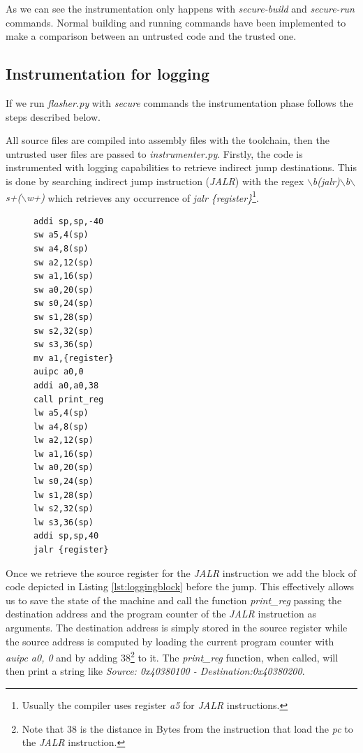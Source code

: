 As we can see the instrumentation only happens with \textit{secure-build} and
\textit{secure-run} commands. Normal building and running commands have been
implemented to make a comparison between an untrusted code and the trusted one.

\subsection{Instrumentation for logging}
\label{subsec:logging}

If we run \textit{flasher.py} with \textit{secure} commands the instrumentation phase
follows the steps described below.

All source files are compiled into assembly files with the toolchain, then the
untrusted user files are passed to \textit{instrumenter.py}. Firstly, the code is
instrumented with logging capabilities to retrieve indirect jump destinations.
This is done by searching indirect jump instruction (\textit{JALR}) with the regex
\textit{$\backslash$b(jalr)$\backslash$b$\backslash$s+($\backslash$w+)} which
retrieves any occurrence of \textit{jalr \{register\}}\footnote{Usually the
compiler uses register \textit{a5} for \textit{JALR} instructions.}.

\begin{figure}
  \setlength{\intextsep}{0pt}
  \begin{minipage}{0.25\textwidth}
    \begin{lstlisting}[style=Assembly, caption = Logging code block, label={lst:loggingblock}]
addi sp,sp,-40
sw a5,4(sp)
sw a4,8(sp)
sw a2,12(sp)
sw a1,16(sp)
sw a0,20(sp)
sw s0,24(sp)
sw s1,28(sp)
sw s2,32(sp)
sw s3,36(sp)
mv a1,{register}
auipc a0,0
addi a0,a0,38
call print_reg
lw a5,4(sp)
lw a4,8(sp)
lw a2,12(sp)
lw a1,16(sp)
lw a0,20(sp)
lw s0,24(sp)
lw s1,28(sp)
lw s2,32(sp)
lw s3,36(sp)
addi sp,sp,40
jalr {register}
    \end{lstlisting}
  \end{minipage}
\end{figure}

Once we retrieve the source register for the \textit{JALR} instruction we add
the block of code depicted in Listing \ref{lst:loggingblock} before the jump. This
effectively allows us to save the state of the machine and call the function \textit{print\_reg}
passing the destination address and the program counter of the \textit{JALR} instruction
as arguments. The destination address is simply stored in the source register
while the source address is computed by loading the current program counter with
\textit{auipc a0, 0} and by adding $38$\footnote{Note that $38$ is the distance
in Bytes from the instruction that load the \textit{pc} to the \textit{JALR}
instruction.} to it. The \textit{print\_reg} function, when called, will then
print a string like \textit{Source: 0x40380100 - Destination:0x40380200}.

